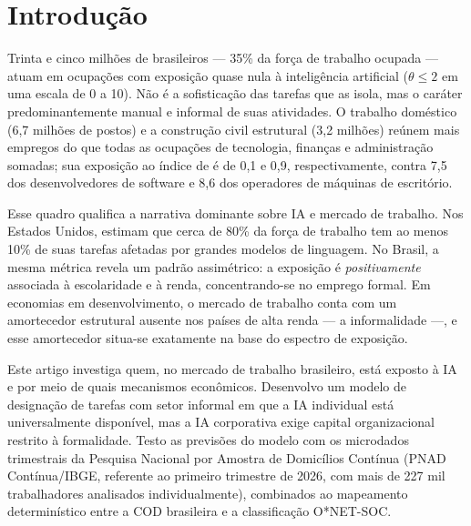 \section{Introdução}
\label{sec:intro}

Trinta e cinco milhões de brasileiros --- 35\% da força de trabalho ocupada --- atuam em ocupações com exposição quase nula à inteligência artificial ($\theta \le 2$ em uma escala de 0 a 10). Não é a sofisticação das tarefas que as isola, mas o caráter predominantemente manual e informal de suas atividades. O trabalho doméstico (6{,}7 milhões de postos) e a construção civil estrutural (3{,}2 milhões) reúnem mais empregos do que todas as ocupações de tecnologia, finanças e administração somadas; sua exposição ao índice de \citet{eloundou2024gpts} é de 0{,}1 e 0{,}9, respectivamente, contra 7{,}5 dos desenvolvedores de software e 8{,}6 dos operadores de máquinas de escritório.

Esse quadro qualifica a narrativa dominante sobre IA e mercado de trabalho. Nos Estados Unidos, \citet{eloundou2024gpts} estimam que cerca de 80\% da força de trabalho tem ao menos 10\% de suas tarefas afetadas por grandes modelos de linguagem. No Brasil, a mesma métrica revela um padrão assimétrico: a exposição é \emph{positivamente} associada à escolaridade e à renda, concentrando-se no emprego formal. Em economias em desenvolvimento, o mercado de trabalho conta com um amortecedor estrutural ausente nos países de alta renda --- a informalidade \citep{gmyrek2023generative} ---, e esse amortecedor situa-se exatamente na base do espectro de exposição.

Este artigo investiga quem, no mercado de trabalho brasileiro, está exposto à IA e por meio de quais mecanismos econômicos. Desenvolvo um modelo de designação de tarefas com setor informal em que a IA individual está universalmente disponível, mas a IA corporativa exige capital organizacional restrito à formalidade. Testo as previsões do modelo com os microdados trimestrais da Pesquisa Nacional por Amostra de Domicílios Contínua (PNAD Contínua/IBGE, referente ao primeiro trimestre de 2026, com mais de 227 mil trabalhadores analisados individualmente), combinados ao mapeamento determinístico entre a COD brasileira e a classificação O*NET-SOC.

